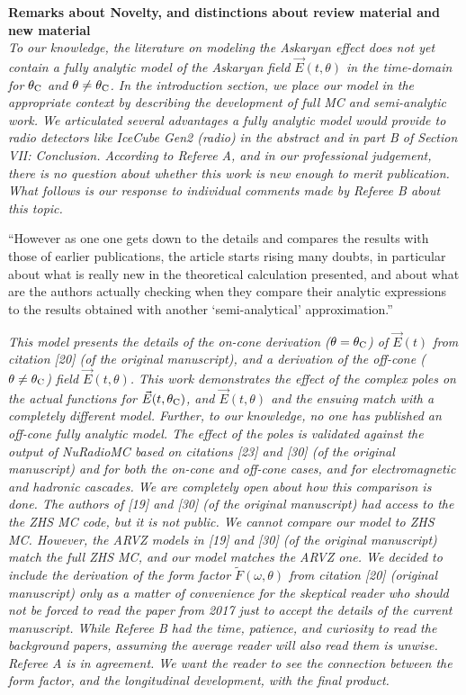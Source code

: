 \documentclass[12pt]{article}
\begin{document}
\textbf{Remarks about Novelty, and distinctions about review material and new material} \\

\textit{To our knowledge, the literature on modeling the Askaryan effect does not yet contain a fully analytic model of the Askaryan field $\vec{E}(t,\theta)$ in the time-domain for $\theta_{\rm C}$ and $\theta \neq \theta_{\rm C}$.  In the introduction section, we place our model in the appropriate context by describing the development of full MC and semi-analytic work.  We articulated several advantages a fully analytic model would provide to radio detectors like IceCube Gen2 (radio) in the abstract and in part B of Section VII: Conclusion.  According to Referee A, and in our professional judgement, there is no question about whether this work is new enough to merit publication.  What follows is our response to individual comments made by Referee B about this topic.}

``However as one one gets down to the details and compares the results with those of earlier publications, the article starts rising many doubts, in particular about what is really new in the theoretical calculation presented, and about what are the authors actually checking when they compare their analytic expressions to the results obtained with another `semi-analytical' approximation.''

\textit{This model presents the details of the on-cone derivation ($\theta = \theta_{\rm C}$) of $\vec{E}(t)$ from citation [20] (of the original manuscript), and a derivation of the off-cone ($\theta \neq \theta_{\rm C}$) field $\vec{E}(t,\theta)$.  This work demonstrates the effect of the complex poles on the actual functions for $\vec{E}(t,\theta_{\rm C})$, and $\vec{E}(t,\theta)$ and the ensuing match with a completely different model.  Further, to our knowledge, no one has published an off-cone fully analytic model.  The effect of the poles is validated against the output of NuRadioMC based on citations [23] and [30] (of the original manuscript) and for both the on-cone and off-cone cases, and for electromagnetic and hadronic cascades.  We are completely open about how this comparison is done.  The authors of [19] and [30] (of the original manuscript) had access to the the ZHS MC code, but it is not public.  We cannot compare our model to ZHS MC.  However, the ARVZ models in [19] and [30] (of the original manuscript) match the full ZHS MC, and our model matches the ARVZ one.  We decided to include the derivation of the form factor $\widetilde{F}(\omega,\theta)$ from citation [20] (original manuscript) only as a matter of convenience for the skeptical reader who should not be forced to read the paper from 2017 just to accept the details of the current manuscript.  While Referee B had the time, patience, and curiosity to read the background papers, assuming the average reader will also read them is unwise.  Referee A is in agreement.  We want the reader to see the connection between the form factor, and the longitudinal development, with the final product.}
\end{document}
